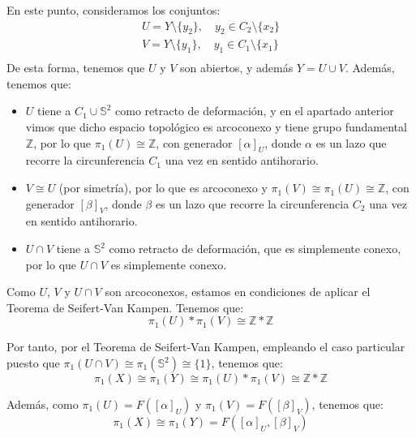\begin{ejercicio}
\begin{enumerate}[label=\alph*)]
            En este punto, consideramos los conjuntos:
            \begin{gather*}
                U = Y\setminus \{y_2\}, \quad y_2\in C_2\setminus\{x_2\} \\
                V = Y\setminus \{y_1\}, \quad y_1\in C_1\setminus\{x_1\} \\
            \end{gather*}
            De esta forma, tenemos que $U$ y $V$ son abiertos, y además $Y = U\cup V$. Además, tenemos que:
            \begin{itemize}
                \item $U$ tiene a $C_1\cup \mathbb{S}^2$ como retracto de deformación, y en el apartado anterior vimos que dicho espacio topológico es arcoconexo y tiene grupo fundamental $\mathbb{Z}$, por lo que $\pi_1(U)\cong \mathbb{Z}$, con generador $[\alpha]_U$, donde $\alpha$ es un lazo que recorre la circunferencia $C_1$ una vez en sentido antihorario.
                

                \item $V\cong U$ (por simetría), por lo que es arcoconexo y $\pi_1(V)\cong \pi_1(U) \cong \mathbb{Z}$, con generador $[\beta]_V$, donde $\beta$ es un lazo que recorre la circunferencia $C_2$ una vez en sentido antihorario.
                \item $U\cap V$ tiene a $\mathbb{S}^2$ como retracto de deformación, que es simplemente conexo, por lo que $U\cap V$ es simplemente conexo.
            \end{itemize}

            Como $U$, $V$ y $U\cap V$ son arcoconexos, estamos en condiciones de aplicar el Teorema de Seifert-Van Kampen. Tenemos que:
            \begin{equation*}
                \pi_1(U)\ast \pi_1(V) \cong \mathbb{Z}\ast \mathbb{Z}
            \end{equation*}

            Por tanto, por el Teorema de Seifert-Van Kampen, empleando el caso particular puesto que $\pi_1(U\cap V) \cong \pi_1(\mathbb{S}^2) \cong \{1\}$, tenemos que:
            \begin{equation*}
                \pi_1(X) \cong \pi_1(Y) \cong \pi_1(U)\ast \pi_1(V) \cong \mathbb{Z}\ast \mathbb{Z}
            \end{equation*}

            Además, como $\pi_1(U)=F\left([\alpha]_U\right)$ y $\pi_1(V)=F\left([\beta]_V\right)$, tenemos que:
            \begin{equation*}
                \pi_1(X) \cong \pi_1(Y) = F\left([\alpha]_U,[\beta]_V\right)
            \end{equation*}


\end{enumerate}
\end{ejercicio}
